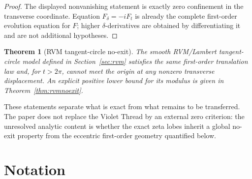 \documentclass[11pt]{article}
\newtheorem{theorem}{Theorem}[section]
\theoremstyle{definition}
\begin{document}
\begin{proof}
The displayed nonvanishing statement is exactly zero confinement in the
transverse coordinate.  Equation $F_\delta=-iF_t$ is already the complete
first-order evolution equation for $F$; higher $\delta$-derivatives are
obtained by differentiating it and are not additional hypotheses.
\end{proof}

\begin{theorem}[RVM tangent-circle no-exit]\label{thm:rvm-main}
The smooth RVM/Lambert tangent-circle model defined in
Section~\ref{sec:rvm} satisfies the same first-order translation law and,
for $t>2\pi$, cannot meet the origin at any nonzero transverse displacement.
An explicit positive lower bound for its modulus is given in
Theorem~\ref{thm:rvmnoexit}.
\end{theorem}

These statements separate what is exact from what remains to be transferred.
The paper does not replace the Violet Thread by an external zero criterion:
the unresolved analytic content is whether the exact zeta lobes inherit a
global no-exit property from the eccentric first-order geometry quantified
below.

\section{Notation}
\end{document}
